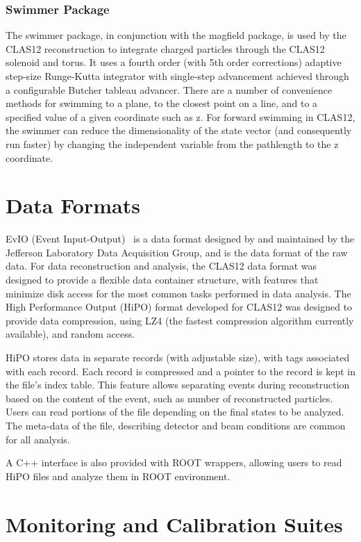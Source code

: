 \documentclass[3p,times,twocolumn]{elsarticle}
\begin{document}
\subsubsection{Swimmer Package}
The swimmer package, in conjunction with the magfield package, is used by the CLAS12
reconstruction to integrate charged particles through the CLAS12 solenoid and torus.
It uses a fourth order (with 5th order corrections) adaptive step-size Runge-Kutta integrator
with single-step advancement achieved through a configurable Butcher tableau advancer.
There are a number of convenience methods for swimming to a plane, to the closest
point on a line, and to a specified value of a given coordinate such as z. For
forward swimming in CLAS12, the swimmer can reduce the dimensionality of the state
vector (and consequently run faster) by changing the independent variable from
the pathlength to the z coordinate.


\section{Data Formats}
EvIO (Event Input-Output)~\cite{evio} is a data format designed by and maintained by the
Jefferson Laboratory Data Acquisition Group, and is the data format of the raw data.
For data reconstruction and analysis, the CLAS12 data format was designed to provide
a flexible data container structure,
with features that minimize disk
access for the most common tasks performed in data analysis.
The High Performance Output (HiPO)
format developed for CLAS12 was designed to provide data compression, using LZ4
(the fastest compression algorithm currently available),
and random access.

HiPO stores data in separate records (with adjustable size), with tags associated with each record. Each record is
compressed and a pointer to the record is kept in the file's index table. This feature allows separating events during
reconstruction based on the content of the event, such as number of reconstructed particles. Users can read portions
of the file depending on the final states to be analyzed.  The meta-data of the file, describing detector and
beam conditions are common for all analysis.

A C++ interface is also provided with ROOT wrappers, allowing users to read HiPO files and analyze them in ROOT
environment.

\section{Monitoring and Calibration Suites}
\end{document}
